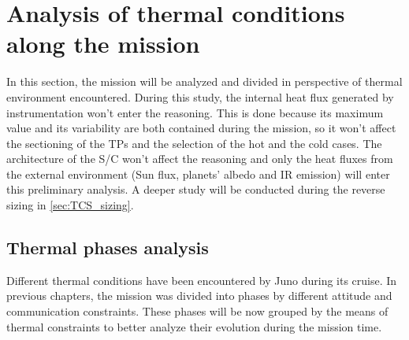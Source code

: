 \section{Analysis of thermal conditions along the mission}
\label{sec:TCS_phases}

In this section, the mission will be analyzed and divided in perspective of thermal environment encountered. During this study, the internal heat flux generated by instrumentation won't enter the reasoning.
This is done because its maximum value and its variability are both contained during the mission, so it won't affect the sectioning of the TPs and the selection of the hot and the cold cases.
The architecture of the S/C won't affect the reasoning and only the heat fluxes from the external environment (Sun flux, planets' albedo and IR emission) will enter this preliminary analysis. A deeper study will be conducted during the reverse sizing in \autoref{sec:TCS_sizing}.

\subsection{Thermal phases analysis}
\label{subsec:TP_analysis}

Different thermal conditions have been encountered by Juno during its cruise. In previous chapters, the mission was divided into phases by different attitude and communication constraints. These phases will be now grouped by the means of thermal constraints to better analyze their evolution during the mission time.

